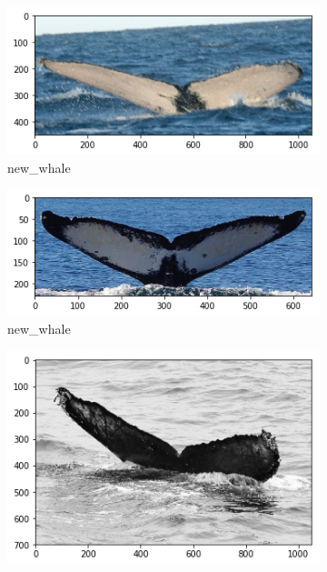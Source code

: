 \begin{frame}[c]
    \begin{figure}
        \centering
        \begin{subfigure}[b]{0.24\linewidth}
            \centering
            \includegraphics[width=\linewidth]{Whales/new_whale0.png}
            \caption{new\_whale}
        \end{subfigure}
        \begin{subfigure}[b]{0.24\linewidth}
            \centering
            \includegraphics[width=\linewidth]{Whales/new_whale4.png}
            \caption{new\_whale}
        \end{subfigure}
        \begin{subfigure}[b]{0.24\linewidth}
            \centering
            \includegraphics[width=\linewidth]{Whales/w_6310ac7.png}

\end{subfigure}
\end{figure}
\end{frame}
